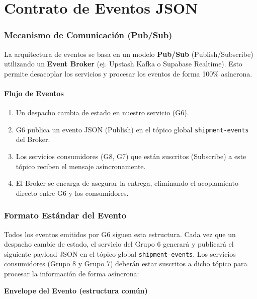 \documentclass[11pt, a4paper]{article}
\newcommand{\contractheader}[1]{%
  \noindent\colorbox{primary!10}{%
    \parbox{\dimexpr\textwidth-2\fboxsep}{%
      \textbf{\faFileCode\quad #1}%
    }%
  }
  \vspace{0.3cm}
}
\begin{document}
\newpage
\part{Contrato de Eventos JSON}

\section{Mecanismo de Comunicación (Pub/Sub)}

La arquitectura de eventos se basa en un modelo \textbf{Pub/Sub} (Publish/Subscribe) utilizando un \textbf{Event Broker} (ej. Upstash Kafka o Supabase Realtime). 
Esto permite desacoplar los servicios y procesar los eventos de forma 100\% asíncrona.

\subsection{Flujo de Eventos}

\begin{enumerate}[noitemsep]
  \item Un despacho cambia de estado en nuestro servicio (G6).
  \item G6 publica un evento JSON (Publish) en el tópico global \texttt{shipment-events} del Broker.
  \item Los servicios consumidores (G8, G7) que están suscritos (Subscribe) a este tópico reciben el mensaje asíncronamente.
  \item El Broker se encarga de asegurar la entrega, eliminando el acoplamiento directo entre G6 y los consumidores.
\end{enumerate}


\section{Formato Estándar del Evento}
\label{sec:formato-evento}

Todos los eventos emitidos por G6 siguen esta estructura. Cada vez que un despacho cambie de estado, el servicio del Grupo 6 generará y publicará el siguiente payload JSON en el tópico global \texttt{shipment-events}. Los servicios consumidores (Grupo 8 y Grupo 7) deberán estar suscritos a dicho tópico para procesar la información de forma asíncrona:

\contractheader{Envelope del Evento (estructura común)}
\end{document}
